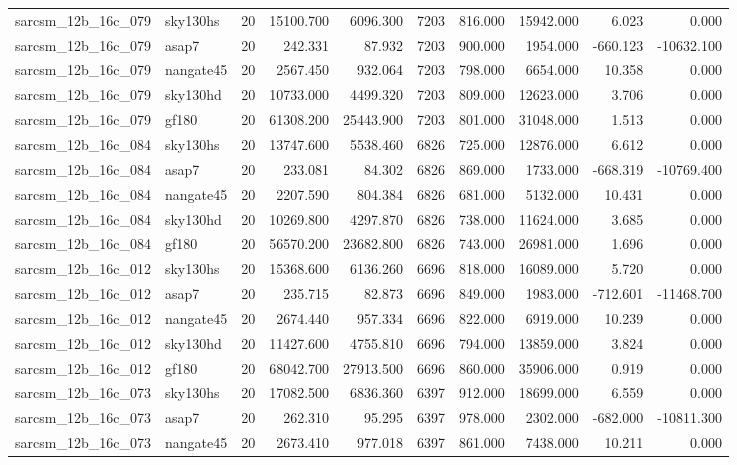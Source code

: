\begin{longtable}{llrrrrrrrr}
sarcsm\_12b\_16c\_079 & sky130hs & 20 & 15100.700 & 6096.300 & 7203 & 816.000 & 15942.000 & 6.023 & 0.000 \\
sarcsm\_12b\_16c\_079 & asap7 & 20 & 242.331 & 87.932 & 7203 & 900.000 & 1954.000 & -660.123 & -10632.100 \\
sarcsm\_12b\_16c\_079 & nangate45 & 20 & 2567.450 & 932.064 & 7203 & 798.000 & 6654.000 & 10.358 & 0.000 \\
sarcsm\_12b\_16c\_079 & sky130hd & 20 & 10733.000 & 4499.320 & 7203 & 809.000 & 12623.000 & 3.706 & 0.000 \\
sarcsm\_12b\_16c\_079 & gf180 & 20 & 61308.200 & 25443.900 & 7203 & 801.000 & 31048.000 & 1.513 & 0.000 \\
sarcsm\_12b\_16c\_084 & sky130hs & 20 & 13747.600 & 5538.460 & 6826 & 725.000 & 12876.000 & 6.612 & 0.000 \\
sarcsm\_12b\_16c\_084 & asap7 & 20 & 233.081 & 84.302 & 6826 & 869.000 & 1733.000 & -668.319 & -10769.400 \\
sarcsm\_12b\_16c\_084 & nangate45 & 20 & 2207.590 & 804.384 & 6826 & 681.000 & 5132.000 & 10.431 & 0.000 \\
sarcsm\_12b\_16c\_084 & sky130hd & 20 & 10269.800 & 4297.870 & 6826 & 738.000 & 11624.000 & 3.685 & 0.000 \\
sarcsm\_12b\_16c\_084 & gf180 & 20 & 56570.200 & 23682.800 & 6826 & 743.000 & 26981.000 & 1.696 & 0.000 \\
sarcsm\_12b\_16c\_012 & sky130hs & 20 & 15368.600 & 6136.260 & 6696 & 818.000 & 16089.000 & 5.720 & 0.000 \\
sarcsm\_12b\_16c\_012 & asap7 & 20 & 235.715 & 82.873 & 6696 & 849.000 & 1983.000 & -712.601 & -11468.700 \\
sarcsm\_12b\_16c\_012 & nangate45 & 20 & 2674.440 & 957.334 & 6696 & 822.000 & 6919.000 & 10.239 & 0.000 \\
sarcsm\_12b\_16c\_012 & sky130hd & 20 & 11427.600 & 4755.810 & 6696 & 794.000 & 13859.000 & 3.824 & 0.000 \\
sarcsm\_12b\_16c\_012 & gf180 & 20 & 68042.700 & 27913.500 & 6696 & 860.000 & 35906.000 & 0.919 & 0.000 \\
sarcsm\_12b\_16c\_073 & sky130hs & 20 & 17082.500 & 6836.360 & 6397 & 912.000 & 18699.000 & 6.559 & 0.000 \\
sarcsm\_12b\_16c\_073 & asap7 & 20 & 262.310 & 95.295 & 6397 & 978.000 & 2302.000 & -682.000 & -10811.300 \\
sarcsm\_12b\_16c\_073 & nangate45 & 20 & 2673.410 & 977.018 & 6397 & 861.000 & 7438.000 & 10.211 & 0.000 \\

\end{longtable}
